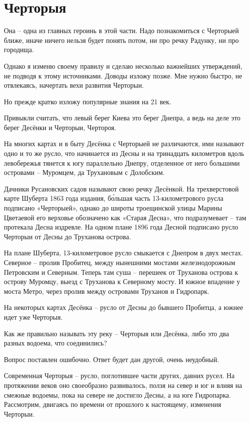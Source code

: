 \chapter{Черторыя}

Она – одна из главных героинь в этой части. Надо познакомиться с Черторыей ближе, иначе ничего нельзя будет понять потом, ни про речку Радунку, ни про городища.

Однако я изменю своему правилу и сделаю несколько важнейших утверждений, не подводя к этому источниками. Доводы изложу позже. Мне нужно быстро, не отвлекаясь, начертать вехи развития Черторыи.

Но прежде кратко изложу популярные знания на 21 век.

Привыкли считать, что левый берег Киева это берег Днепра, а ведь на деле это берег Десёнки и Черторыи, Чертороя. 

На многих картах и в быту Десёнка с Черторыей не различаются, ими называют одно и то же русло, что начинается из Десны и на тринадцать километров вдоль левобережья тянется к югу параллельно Днепру, отделенное от него большими островами – Муромцем, да Трухановым с Долобским.

Дачники Русановских садов называют свою речку Десёнкой. На трехверстовой карте Шуберта 1863 года издания, б\'ольшая часть 13-километрового русла подписано «Черторыей», однако до широты троещинской улицы Марины Цветаевой его верховье обозначено как «Старая Десна», что подразумевает – там протекала Десна издревле. На одном плане 1896 года Десной подписано русло Черторыи от Десны до Труханова острова.

На плане Шуберта, 13-километровое русло смыкается с Днепром в двух местах. Северное – пролив Пробитец, между нынешними мостами железнодорожным Петровским и Северным. Теперь там суша – перешеек от Труханова острова к острову Муромцу, выезд с Труханова к Северному мосту. И южное впадение у моста Метро, через пролив между островами Труханов и Гидропарк.

На некоторых картах Десёнка – русло от Десны до бывшего Пробитца, а южнее идет уже Черторыя.

Как же правильно называть эту реку – Черторыя или Десёнка, либо это два разных водоема, что соединились?

Вопрос поставлен ошибочно. Ответ будет дан другой, очень неудобный.

Современная Черторыя – русло, поглотившее части других, давних русел. На протяжении веков оно своеобразно развивалось, ползя на север и юг и влияя на смежные водоемы, пока на севере не достигло Десны, а на юге Гидропарка. Рассмотрим, двигаясь по времени от прошлого к настоящему, изменения Черторыи.

